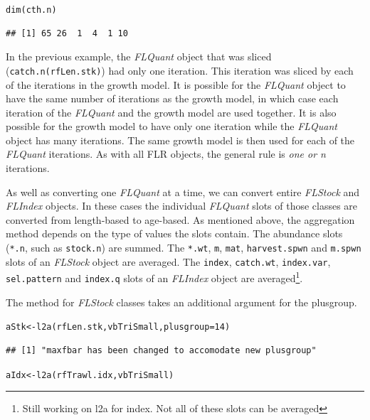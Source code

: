 \documentclass[a4paper,english,10pt]{article}\usepackage[]{graphicx}\usepackage[]{color}
\makeatletter
\newcommand{\hlnum}[1]{\textcolor[rgb]{0.2,0.2,0.2}{#1}}%
\newcommand{\hlstd}[1]{\textcolor[rgb]{0,0,0}{#1}}%
\newcommand{\hlkwb}[1]{\textcolor[rgb]{0.361,0.506,0.596}{#1}}%
\newcommand{\hlkwc}[1]{\textcolor[rgb]{0.361,0.506,0.596}{#1}}%
\newcommand{\hlkwd}[1]{\textcolor[rgb]{0.361,0.506,0.596}{#1}}%
\newenvironment{kframe}{%
 \def\at@end@of@kframe{}%
 \ifinner\ifhmode%
  \def\at@end@of@kframe{\end{minipage}}%
  \begin{minipage}{\columnwidth}%
 \fi\fi%
 \def\FrameCommand##1{\hskip\@totalleftmargin \hskip-\fboxsep
 \colorbox{shadecolor}{##1}\hskip-\fboxsep
     \hskip-\linewidth \hskip-\@totalleftmargin \hskip\columnwidth}%
 \MakeFramed {\advance\hsize-\width
   \@totalleftmargin\z@ \linewidth\hsize
   \@setminipage}}%
 {\par\unskip\endMakeFramed%
 \at@end@of@kframe}
\newenvironment{knitrout}{}{} %
\newcommand{\code}[1]{{\texttt{#1}}}
\newcommand{\class}[1]{{\textit{#1}}}
\makeatother
\begin{document}
\begin{knitrout}
\color{fgcolor}\begin{kframe}
\begin{alltt}
\hlkwd{dim}\hlstd{(cth.n)}
\end{alltt}
\begin{verbatim}
## [1] 65 26  1  4  1 10
\end{verbatim}
\end{kframe}
\end{knitrout}


In the previous example, the \class{FLQuant} object that was sliced (\code{catch.n(rfLen.stk)}) had only one iteration. This iteration was sliced by each of the iterations in the growth model. It is possible for the \class{FLQuant} object to have the same number of iterations as the growth model, in which case each iteration of the \class{FLQuant} and the growth model are used together. It is also possible for the growth model to have only one iteration while the \class{FLQuant} object has many iterations. The same growth model is then used for each of the \class{FLQuant} iterations. As with all FLR objects, the general rule is \emph{one or n} iterations.


As well as converting one \class{FLQuant} at a time, we can convert entire \class{FLStock} and \class{FLIndex} objects. In these cases the individual \class{FLQuant} slots of those classes are converted from length-based to age-based. As mentioned above, the aggregation method depends on the type of values the slots contain. The abundance slots (\code{*.n}, such as \code{stock.n}) are summed. The \code{*.wt}, \code{m}, \code{mat}, \code{harvest.spwn} and \code{m.spwn} slots of an \class{FLStock} object are averaged. The \code{index}, \code{catch.wt}, \code{index.var}, \code{sel.pattern} and \code{index.q} slots of an \class{FLIndex} object are averaged\footnote{Still working on l2a for index. Not all of these slots can be averaged}.

The method for \class{FLStock} classes takes an additional argument for the plusgroup.

\begin{knitrout}
\color{fgcolor}\begin{kframe}
\begin{alltt}
\hlstd{aStk} \hlkwb{<-} \hlkwd{l2a}\hlstd{(rfLen.stk, vbTriSmall,} \hlkwc{plusgroup} \hlstd{=} \hlnum{14}\hlstd{)}
\end{alltt}
\begin{verbatim}
## [1] "maxfbar has been changed to accomodate new plusgroup"
\end{verbatim}
\begin{alltt}
\hlstd{aIdx} \hlkwb{<-} \hlkwd{l2a}\hlstd{(rfTrawl.idx, vbTriSmall)}
\end{alltt}
\end{kframe}
\end{knitrout}
\end{document}
